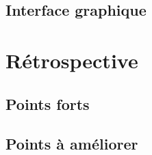 \subsection{Interface graphique}


\section{Rétrospective}

\subsection{Points forts}


\subsection{Points à améliorer}
